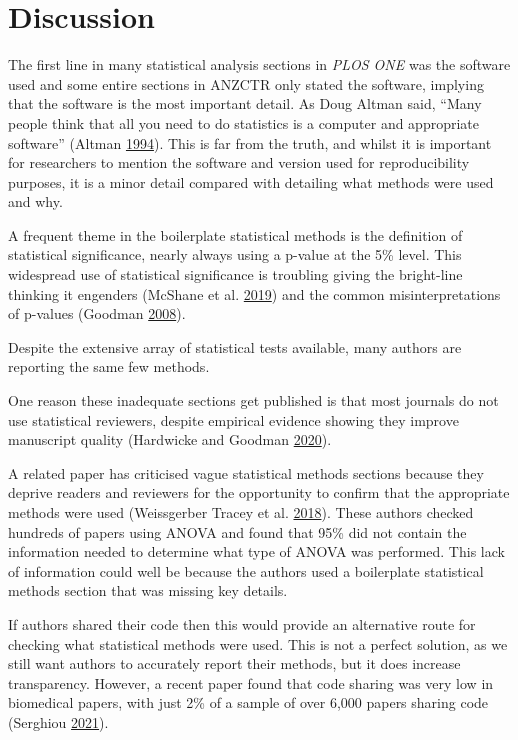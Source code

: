 \documentclass[
]{article}
\begin{document}
\hypertarget{discussion}{%
\section{Discussion}\label{discussion}}

The first line in many statistical analysis sections in \emph{PLOS ONE} was the software used and some entire sections in ANZCTR only stated the software, implying that the software is the most important detail. As Doug Altman said, ``Many people think that all you need to do statistics is a computer and appropriate software'' (Altman \protect\hyperlink{ref-Altman1994}{1994}). This is far from the truth, and whilst it is important for researchers to mention the software and version used for reproducibility purposes, it is a minor detail compared with detailing what methods were used and why.

A frequent theme in the boilerplate statistical methods is the definition of statistical significance, nearly always using a p-value at the 5\% level. This widespread use of statistical significance is troubling giving the bright-line thinking it engenders (McShane et al. \protect\hyperlink{ref-McShane2019}{2019}) and the common misinterpretations of p-values (Goodman \protect\hyperlink{ref-Goodman2008}{2008}).

Despite the extensive array of statistical tests available, many authors are reporting the same few methods.

One reason these inadequate sections get published is that most journals do not use statistical reviewers, despite empirical evidence showing they improve manuscript quality (Hardwicke and Goodman \protect\hyperlink{ref-Hardwicke2020}{2020}).

A related paper has criticised vague statistical methods sections because they deprive readers and reviewers for the opportunity to confirm that the appropriate methods were used (Weissgerber Tracey et al. \protect\hyperlink{ref-Weissgerber2018}{2018}). These authors checked hundreds of papers using ANOVA and found that 95\% did not contain the information needed to determine what type of ANOVA was performed. This lack of information could well be because the authors used a boilerplate statistical methods section that was missing key details.

If authors shared their code then this would provide an alternative route for checking what statistical methods were used. This is not a perfect solution, as we still want authors to accurately report their methods, but it does increase transparency. However, a recent paper found that code sharing was very low in biomedical papers, with just 2\% of a sample of over 6,000 papers sharing code (Serghiou \protect\hyperlink{ref-Serghiou2021}{2021}).
\end{document}
